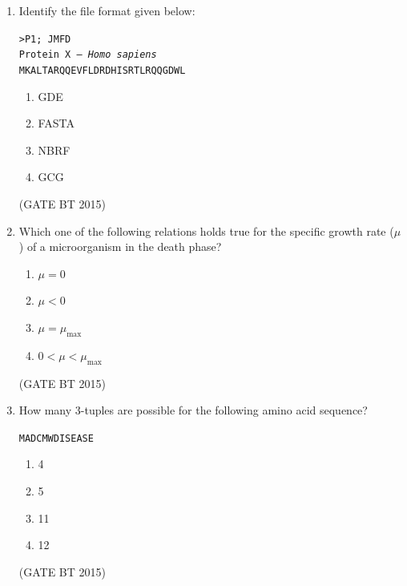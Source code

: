 \documentclass[journal,12pt,onecolumn]{IEEEtran}
\begin{document}
\begin{enumerate}[label=\textbf{Q.\arabic*}]
    \item Identify the file format given below:  

    \texttt{>P1; JMFD} \\
    \texttt{Protein X -- \textit{Homo sapiens}} \\
    \texttt{MKALTARQQEVFLDRDHISRTLRQQGDWL}

    \begin{multicols}{4}
        \begin{enumerate}
            \item GDE
            \item FASTA
            \item NBRF
            \item GCG
        \end{enumerate}
    \end{multicols}             \hfill (GATE BT 2015)

    \item Which one of the following relations holds true for the specific growth rate ($\mu$) of a microorganism in the death phase?  

    \begin{multicols}{2}
        \begin{enumerate}
            \item $\mu = 0$
            \item $\mu < 0$
            \item $\mu = \mu_{\max}$
            \item $0 < \mu < \mu_{\max}$
        \end{enumerate}
    \end{multicols}             \hfill (GATE BT 2015)

    \item How many 3-tuples are possible for the following amino acid sequence?  

    \texttt{MADCMWDISEASE}

    \begin{multicols}{4}
        \begin{enumerate}
            \item 4
            \item 5
            \item 11
            \item 12
        \end{enumerate}
    \end{multicols}             \hfill (GATE BT 2015)


\end{enumerate}
\end{document}
